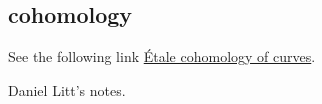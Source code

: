 \documentclass[../main.tex]{subfiles}
\begin{document}
\subsection{\Etale cohomology}
\begin{example}
See the following link \href{https://static1.squarespace.com/static/57bf2a6de3df281593b7f57d/t/57bf67e76a49636398ee243f/1472161768284/cohomologyofcurves}{\'{E}tale cohomology of curves}.
\end{example}

\begin{example}
Daniel Litt's notes.
\end{example}
\end{document}
